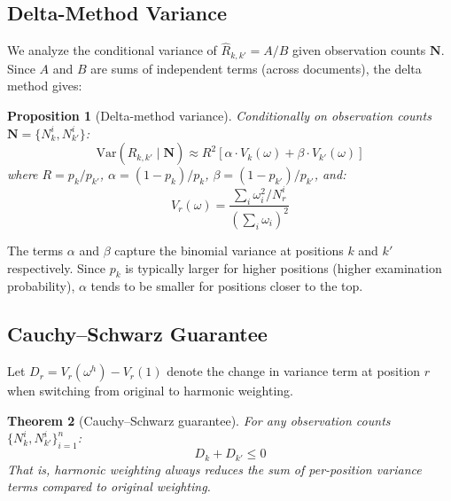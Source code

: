 \documentclass[sigconf]{acmart}
\newtheorem{theorem}{Theorem}
\newtheorem{proposition}[theorem]{Proposition}
\begin{document}
\subsection{Delta-Method Variance}

We analyze the conditional variance of $\hat{R}_{k,k'} = A/B$ given observation counts $\mathbf{N}$. Since $A$ and $B$ are sums of independent terms (across documents), the delta method gives:

\begin{proposition}[Delta-method variance]
\label{prop:delta_method}
Conditionally on observation counts $\mathbf{N} = \{N_k^i, N_{k'}^i\}$:
\begin{equation}
\mathrm{Var}(\hat{R}_{k,k'} \mid \mathbf{N}) \approx R^2 \left[\alpha \cdot V_k(\omega) + \beta \cdot V_{k'}(\omega)\right]
\end{equation}
where $R = p_k/p_{k'}$, $\alpha = (1-p_k)/p_k$, $\beta = (1-p_{k'})/p_{k'}$, and:
\begin{equation}
V_r(\omega) = \frac{\sum_i \omega_i^2 / N_r^i}{\left(\sum_i \omega_i\right)^2}
\end{equation}
\end{proposition}

The terms $\alpha$ and $\beta$ capture the binomial variance at positions $k$ and $k'$ respectively. Since $p_k$ is typically larger for higher positions (higher examination probability), $\alpha$ tends to be smaller for positions closer to the top.

\subsection{Cauchy–Schwarz Guarantee}

Let $D_r = V_r(\omega^h) - V_r(1)$ denote the change in variance term at position $r$ when switching from original to harmonic weighting.

\begin{theorem}[Cauchy–Schwarz guarantee]
\label{thm:cs}
For any observation counts $\{N_k^i, N_{k'}^i\}_{i=1}^n$:
\[
D_k + D_{k'} \leq 0
\]
That is, harmonic weighting always reduces the sum of per-position variance terms compared to original weighting.
\end{theorem}
\end{document}
